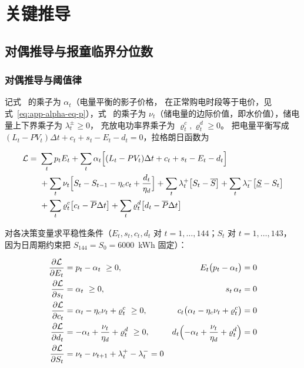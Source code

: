\section{关键推导}

\subsection{对偶推导与报童临界分位数}

\subsubsection{对偶推导与阈值律}

记式~ 的乘子为 $\alpha_t$（电量平衡的影子价格，
在正常购电时段等于电价，见式~\eqref{eq:app-alpha-eq-p}），式~ 的乘子为
$\nu_t$（储电量的边际价值，即水价值），储电量上下界乘子为 $\lambda^{\pm}_t\ge 0$，
充放电功率界乘子为 $\varrho^{c}_t,\varrho^{d}_t\ge 0$。
把电量平衡写成 $(L_t-PV_t)\Delta t+c_t+s_t-E_t-d_t=0$，拉格朗日函数为

\begin{equation}
  \begin{aligned}
    \mathcal L=\ &\sum_{t}p_tE_t
    +\sum_{t}\alpha_t\Bigl[(L_t-PV_t)\Delta t+c_t+s_t-E_t-d_t\Bigr]\\
    &+\sum_{t}\nu_t\Bigl[S_t-S_{t-1}-\eta_cc_t+\frac{d_t}{\eta_d}\Bigr]
    +\sum_{t}\lambda^{+}_t\bigl[S_t-\overline S\bigr]
    +\sum_{t}\lambda^{-}_t\bigl[\underline S-S_t\bigr]\\
    &+\sum_{t}\varrho^{c}_t\bigl[c_t-\overline P\Delta t\bigr]
    +\sum_{t}\varrho^{d}_t\bigl[d_t-\overline P\Delta t\bigr]
  \end{aligned}
  \label{eq:app-lag}
\end{equation}

对各决策变量求平稳性条件（$E_t,s_t,c_t,d_t$ 对 $t=1,\dots,144$；$S_t$ 对 $t=1,\dots,143$，
因为日周期约束把 $S_{144}=S_0=6000$~kWh 固定）：

\begin{align}
  \frac{\partial\mathcal L}{\partial E_t}&=p_t-\alpha_t\ \ge 0,
  &E_t\bigl(p_t-\alpha_t\bigr)&=0 \label{eq:app-stat-E}\\
  \frac{\partial\mathcal L}{\partial s_t}&=\alpha_t\ \ge 0,
  &s_t\,\alpha_t&=0 \label{eq:app-stat-s}\\
  \frac{\partial\mathcal L}{\partial c_t}&=\alpha_t-\eta_c\nu_t+\varrho^{c}_t\ \ge 0,
  &c_t\bigl(\alpha_t-\eta_c\nu_t+\varrho^{c}_t\bigr)&=0 \label{eq:app-stat-c}\\
  \frac{\partial\mathcal L}{\partial d_t}&=-\alpha_t+\frac{\nu_t}{\eta_d}+\varrho^{d}_t\ \ge 0,
  &d_t\Bigl(-\alpha_t+\frac{\nu_t}{\eta_d}+\varrho^{d}_t\Bigr)&=0 \label{eq:app-stat-d}\\
  \frac{\partial\mathcal L}{\partial S_t}&=\nu_t-\nu_{t+1}+\lambda^{+}_t-\lambda^{-}_t=0
  \label{eq:app-stat-S}
\end{align}


